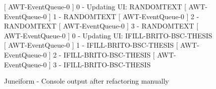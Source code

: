 \begin{figure}[H]
\begin{sourcecode}
\begin{textcode}{}
[ AWT-EventQueue-0 ] 0 - Updating UI: RANDOMTEXT
[ AWT-EventQueue-0 ] 1 - RANDOMTEXT
[ AWT-EventQueue-0 ] 2 - RANDOMTEXT
[ AWT-EventQueue-0 ] 3 - RANDOMTEXT
[ AWT-EventQueue-0 ] 0 - Updating UI: IFILL-BRITO-BSC-THESIS
[ AWT-EventQueue-0 ] 1 - IFILL-BRITO-BSC-THESIS
[ AWT-EventQueue-0 ] 2 - IFILL-BRITO-BSC-THESIS
[ AWT-EventQueue-0 ] 3 - IFILL-BRITO-BSC-THESIS
\end{textcode}
\caption{Juneiform - Console output after refactoring manually}
\label{code:example-console}
\end{sourcecode}
\end{figure}